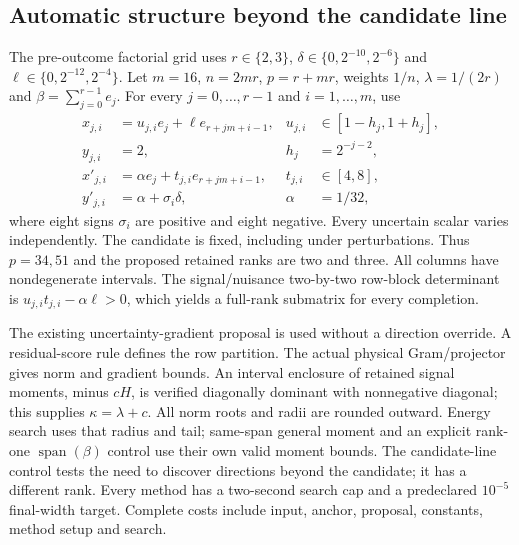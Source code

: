 \subsection{Automatic structure beyond the candidate line}\label{app:multirank-v82}
The pre-outcome factorial grid uses $r\in\{2,3\}$, $\delta\in\{0,2^{-10},2^{-6}\}$ and $\ell\in\{0,2^{-12},2^{-4}\}$. Let $m=16$, $n=2mr$, $p=r+mr$, weights $1/n$, $\lambda=1/(2r)$ and $\beta=\sum_{j=0}^{r-1}e_j$. For every $j=0,\ldots,r-1$ and $i=1,\ldots,m$, use
\begin{align*}
 x_{j,i}&=u_{j,i}e_j+\ell e_{r+jm+i-1},
 &u_{j,i}&\in[1-h_j,1+h_j],\\
 y_{j,i}&=2,&h_j&=2^{-j-2},\\
 x'_{j,i}&=\alpha e_j+t_{j,i}e_{r+jm+i-1},
 &t_{j,i}&\in[4,8],\\
 y'_{j,i}&=\alpha+\sigma_i\delta,&\alpha&=1/32,
\end{align*}
where eight signs $\sigma_i$ are positive and eight negative. Every uncertain scalar varies independently. The candidate is fixed, including under perturbations. Thus $p=34,51$ and the proposed retained ranks are two and three. All columns have nondegenerate intervals. The signal/nuisance two-by-two row-block determinant is $u_{j,i}t_{j,i}-\alpha\ell>0$, which yields a full-rank submatrix for every completion.

The existing uncertainty-gradient proposal is used without a direction override. A residual-score rule defines the row partition. The actual physical Gram/projector gives norm and gradient bounds. An interval enclosure of retained signal moments, minus $cH$, is verified diagonally dominant with nonnegative diagonal; this supplies $\kappa=\lambda+c$. All norm roots and radii are rounded outward. Energy search uses that radius and tail; same-span general moment and an explicit rank-one $\operatorname{span}(\beta)$ control use their own valid moment bounds. The candidate-line control tests the need to discover directions beyond the candidate; it has a different rank. Every method has a two-second search cap and a predeclared $10^{-5}$ final-width target. Complete costs include input, anchor, proposal, constants, method setup and search.

